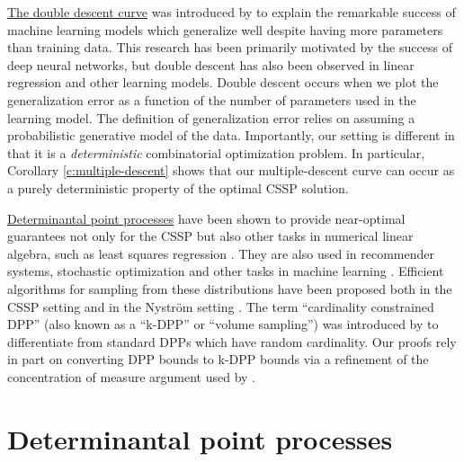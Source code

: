 \documentclass{article}
\begin{document}
\underline{The double descent curve} was introduced by \citet{BHMM19} to explain
the remarkable success of machine learning models which generalize
well despite having more parameters than training data. This research 
has been primarily motivated by the success of deep neural networks,
but double descent has also been observed in linear regression
\citep{belkin2019two,BLLT19_TR,surrogate-design} and other learning models.
Double descent occurs when we plot the
generalization error as a function of the number of parameters used in the
learning model. The definition of generalization error
relies on assuming a probabilistic generative model of
the data. Importantly, our setting is different in that it is a \emph{deterministic} combinatorial
optimization problem. In particular, Corollary
\ref{c:multiple-descent} shows that our multiple-descent curve can
occur as a purely deterministic property of the optimal CSSP solution.

\underline{Determinantal point processes} have been shown to provide
near-optimal guarantees not only for the CSSP but also other tasks in
numerical linear algebra, such as least squares regression
\citep[e.g.,][]{avron-boutsidis13,unbiased-estimates-journal,minimax-experimental-design}.
They are also used in recommender systems, stochastic optimization and other
tasks in machine learning \citep[for a review,
see][]{dpp-ml}. Efficient algorithms for sampling from these
distributions have been proposed both in the CSSP setting \citep[i.e.,
given matrix $\A$; see, e.g.,][]{efficient-volume-sampling,dpp-intermediate}
and in the Nystr\"om setting \citep[i.e., given kernel $\K$;
see, e.g.,][]{rayleigh-mcmc,dpp-sublinear}. The term ``cardinality constrained
DPP'' (also known as a ``k-DPP'' or ``volume sampling'') was introduced by \citet{k-dpp} to
differentiate from standard DPPs which have random cardinality.
Our proofs rely in part on converting DPP bounds to
k-DPP bounds via a refinement of the
concentration of measure argument used by
\citet{bayesian-experimental-design}.


\section{Determinantal point processes}
\label{s:dpp}
\end{document}
